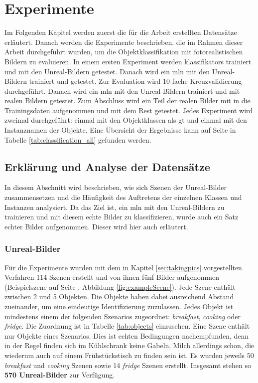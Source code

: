 \graphicspath{{./images/}}      
\def\CHAPTERONE{./chapters/Chapter-1} 

\chapter{Experimente}
\label{chap:experiments}
%	

Im Folgenden Kapitel werden zuerst die für die Arbeit erstellten Datensätze erläutert. Danach werden die Experimente beschrieben, die im Rahmen dieser Arbeit durchgeführt wurden, um die Objektklassifikation mit fotorealistischen Bildern zu evaluieren. \newline
In einem ersten Experiment werden \glspl{klassifikator} trainiert und mit den Unreal-Bildern getestet. Danach wird ein \gls{mln} mit den Unreal-Bildern trainiert und getestet. Zur Evaluation wird 10-fache Kreuzvalidierung durchgeführt. Danach wird ein \gls{mln} mit den Unreal-Bildern trainiert und mit realen Bildern getestet. Zum Abschluss wird ein Teil der realen Bilder mit in die Trainingsdaten aufgenommen und mit dem Rest getestet. Jedes Experiment wird zweimal durchgeführt: einmal mit den Objektklassen als \gls{gt} und einmal mit den Instanznamen der Objekte. Eine Übersicht  der Ergebnisse kann auf Seite \pageref{tab:classification_all} in Tabelle \ref{tab:classification_all} gefunden werden.

\section{Erklärung und Analyse der Datensätze}

In diesem Abschnitt wird beschrieben, wie sich Szenen der Unreal-Bilder zusammensetzen und die Häufigkeit des Auftretens der einzelnen Klassen und Instanzen analysiert. Da das Ziel ist, ein \gls{mln} mit den Unreal-Bildern zu trainieren und mit diesem echte Bilder zu klassifizieren, wurde auch ein Satz echter Bilder aufgenommen. Dieser wird hier auch erläutert.

\subsection{Unreal-Bilder}  
Für die Experimente wurden mit dem in Kapitel \ref{sec:takingpics} vorgestellten Verfahren 114 Szenen erstellt und von ihnen fünf Bilder aufgenommen (Beispielszene auf Seite \pageref{fig:exampleScene}, Abbildung \ref{fig:exampleScene}). Jede Szene enthält zwischen 2 und 5 Objekten. Die Objekte haben dabei ausreichend Abstand zueinander, um eine eindeutige Identifizierung zuzulassen. Jedes Objekt ist mindestens einem der folgenden Szenarios zugeordnet: \textit{breakfast}, \textit{cooking} oder \textit{fridge}. Die Zuordnung ist in Tabelle \ref{tab:objects} einzusehen. Eine Szene enthält nur Objekte eines Szenarios. Dies ist echten Bedingungen nachempfunden, denn in der Regel finden sich im Kühlschrank keine Gabeln, Milch allerdings schon, die wiederum auch auf einem Frühstückstisch zu finden sein ist. Es wurden jeweils 50 \textit{breakfast} und \textit{cooking} Szenen sowie 14 \textit{fridge} Szenen erstellt. Insgesamt stehen so \textbf{570 Unreal-Bilder} zur Verfügung. \par

